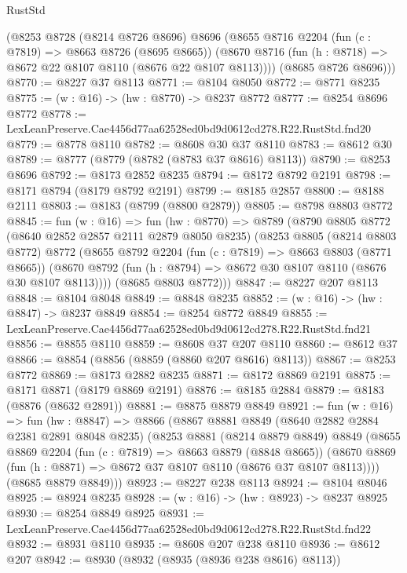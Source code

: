 \begin{lexlean}{RustStd}
\begin{coremodule}
      (@8253
        @8728
        (@8214 @8726 @8696)
        @8696
        (@8655
          @8716
          @2204
          (fun (c : @7819) => @8663 @8726 (@8695 @8665))
          (@8670 @8716 (fun (h : @8718) => @8672 @22 @8107 @8110 (@8676 @22 @8107 @8113))))
        (@8685 @8726 @8696)))
@8770 := @8227 @37 @8113
@8771 := @8104 @8050
@8772 := @8771 @8235
@8775 := (w : @16) -> (hw : @8770) -> @8237 @8772
@8777 := @8254 @8696 @8772
@8778 := LexLeanPreserve.Cae4456d77aa62528ed0bd9d0612cd278.R22.RustStd.fnd20
@8779 := @8778 @8110
@8782 := @8608 @30 @37 @8110
@8783 := @8612 @30
@8789 := @8777 (@8779 (@8782 (@8783 @37 @8616) @8113))
@8790 := @8253 @8696
@8792 := @8173 @2852 @8235
@8794 := @8172 @8792 @2191
@8798 := @8171 @8794 (@8179 @8792 @2191)
@8799 := @8185 @2857
@8800 := @8188 @2111
@8803 := @8183 (@8799 (@8800 @2879))
@8805 := @8798 @8803 @8772
@8845 := fun (w : @16) =>
  fun (hw : @8770) =>
  @8789
    (@8790
      @8805
      @8772
      (@8640 @2852 @2857 @2111 @2879 @8050 @8235)
      (@8253
        @8805
        (@8214 @8803 @8772)
        @8772
        (@8655
          @8792
          @2204
          (fun (c : @7819) => @8663 @8803 (@8771 @8665))
          (@8670 @8792 (fun (h : @8794) => @8672 @30 @8107 @8110 (@8676 @30 @8107 @8113))))
        (@8685 @8803 @8772)))
@8847 := @8227 @207 @8113
@8848 := @8104 @8048
@8849 := @8848 @8235
@8852 := (w : @16) -> (hw : @8847) -> @8237 @8849
@8854 := @8254 @8772 @8849
@8855 := LexLeanPreserve.Cae4456d77aa62528ed0bd9d0612cd278.R22.RustStd.fnd21
@8856 := @8855 @8110
@8859 := @8608 @37 @207 @8110
@8860 := @8612 @37
@8866 := @8854 (@8856 (@8859 (@8860 @207 @8616) @8113))
@8867 := @8253 @8772
@8869 := @8173 @2882 @8235
@8871 := @8172 @8869 @2191
@8875 := @8171 @8871 (@8179 @8869 @2191)
@8876 := @8185 @2884
@8879 := @8183 (@8876 (@8632 @2891))
@8881 := @8875 @8879 @8849
@8921 := fun (w : @16) =>
  fun (hw : @8847) =>
  @8866
    (@8867
      @8881
      @8849
      (@8640 @2882 @2884 @2381 @2891 @8048 @8235)
      (@8253
        @8881
        (@8214 @8879 @8849)
        @8849
        (@8655
          @8869
          @2204
          (fun (c : @7819) => @8663 @8879 (@8848 @8665))
          (@8670 @8869 (fun (h : @8871) => @8672 @37 @8107 @8110 (@8676 @37 @8107 @8113))))
        (@8685 @8879 @8849)))
@8923 := @8227 @238 @8113
@8924 := @8104 @8046
@8925 := @8924 @8235
@8928 := (w : @16) -> (hw : @8923) -> @8237 @8925
@8930 := @8254 @8849 @8925
@8931 := LexLeanPreserve.Cae4456d77aa62528ed0bd9d0612cd278.R22.RustStd.fnd22
@8932 := @8931 @8110
@8935 := @8608 @207 @238 @8110
@8936 := @8612 @207
@8942 := @8930 (@8932 (@8935 (@8936 @238 @8616) @8113))

\end{coremodule}
\end{lexlean}
